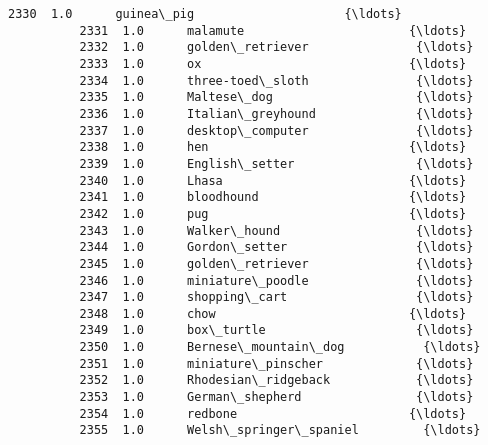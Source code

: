 \documentclass[11pt]{article}
\begin{document}
\begin{Verbatim}[commandchars=\\\{\}]
          2330  1.0      guinea\_pig                     {\ldots}       
          2331  1.0      malamute                       {\ldots}       
          2332  1.0      golden\_retriever               {\ldots}       
          2333  1.0      ox                             {\ldots}       
          2334  1.0      three-toed\_sloth               {\ldots}       
          2335  1.0      Maltese\_dog                    {\ldots}       
          2336  1.0      Italian\_greyhound              {\ldots}       
          2337  1.0      desktop\_computer               {\ldots}       
          2338  1.0      hen                            {\ldots}       
          2339  1.0      English\_setter                 {\ldots}       
          2340  1.0      Lhasa                          {\ldots}       
          2341  1.0      bloodhound                     {\ldots}       
          2342  1.0      pug                            {\ldots}       
          2343  1.0      Walker\_hound                   {\ldots}       
          2344  1.0      Gordon\_setter                  {\ldots}       
          2345  1.0      golden\_retriever               {\ldots}       
          2346  1.0      miniature\_poodle               {\ldots}       
          2347  1.0      shopping\_cart                  {\ldots}       
          2348  1.0      chow                           {\ldots}       
          2349  1.0      box\_turtle                     {\ldots}       
          2350  1.0      Bernese\_mountain\_dog           {\ldots}       
          2351  1.0      miniature\_pinscher             {\ldots}       
          2352  1.0      Rhodesian\_ridgeback            {\ldots}       
          2353  1.0      German\_shepherd                {\ldots}       
          2354  1.0      redbone                        {\ldots}       
          2355  1.0      Welsh\_springer\_spaniel         {\ldots}       
          

\end{Verbatim}
\end{document}
